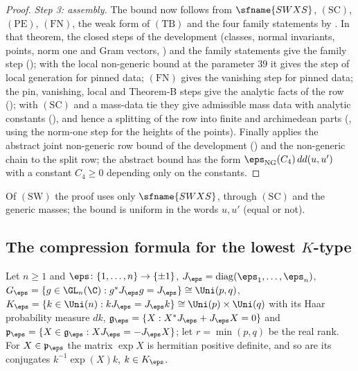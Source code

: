 \begin{proof}
\emph{Step 3: assembly.} The bound now follows from $\sfname{SWXS}$, $(\mathrm{SC})$, $(\mathrm{PE})$, $(\mathrm{FN})$,
the weak form of $(\mathrm{TB})$ and the four family statements by
. In that theorem, the closed steps
of the development (classes, normal invariants, points, norm one and Gram vectors,
) and the family statements give the family step
(); with the local non-generic bound at the parameter
$39$ it gives the step of local generation for pinned data; $(\mathrm{FN})$ gives the vanishing step for pinned
data; the pin, vanishing, local and Theorem-B steps give the analytic facts of the row
(); with $(\mathrm{SC})$ and a mass-data tie they give
admissible mass data with analytic constants (),
and hence a splitting of the row into finite and archimedean parts
(, using the norm-one step for the heights of the
points). Finally  applies the abstract
joint non-generic row bound of the development () and the
non-generic chain to the split row; the abstract bound has the form $\eps_{\mathrm{NG}}(C_4)\,dd(u,u')$ with a
constant $C_4\ge0$ depending only on the constants.
\end{proof}

\begin{remark}\label{pf:sh-flag:rem:rowng}
Of $(\mathrm{SW})$ the proof uses only $\sfname{SWXS}$, through $(\mathrm{SC})$ and the generic masses; the bound is
uniform in the words $u,u'$ (equal or not).
\end{remark}

\subsection{The compression formula for the lowest $K$-type}\label{sec:pf:sh-flag:lowk}

Let $n\ge1$ and $\eps\colon\{1,\dots,n\}\to\{\pm1\}$, $J_\eps=\mathrm{diag}(\eps_1,\dots,\eps_n)$, $G_\eps=\{g\in
\GL_n(\C):g^*J_\eps g=J_\eps\}\cong\Uni(p,q)$, $K_\eps=\{k\in\Uni(n):kJ_\eps=J_\eps k\}\cong\Uni(p)\times\Uni(q)$ with its
Haar probability measure $dk$, $\mathfrak g_\eps=\{X:X^*J_\eps+J_\eps X=0\}$ and
$\mathfrak p_\eps=\{X\in\mathfrak g_\eps:XJ_\eps=-J_\eps X\}$; let $r=\min(p,q)$ be the real rank. For $X\in\mathfrak
p_\eps$ the matrix $\exp X$ is hermitian positive definite, and so are its conjugates $k^{-1}\exp(X)k$, $k\in K_\eps$.

